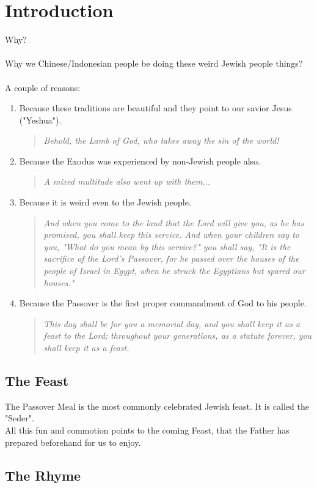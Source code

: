 \documentclass[10pt,oneside,footinclude=true,headinclude=true]{scrbook} %
\newcommand\quot[1]{
	\begin{quote}\textit{\small#1}\end{quote}
}
\begin{document}
\setcounter{chapter}{-1}
\chapter{Introduction}

Why?\\
\\
Why we Chinese/Indonesian people be doing these weird Jewish people things?\\
\\
A couple of reasons:
\begin{enumerate}
	\item{
		Because these traditions are beautiful and they point to our savior Jesus ("Yeshua").
		\quot{Behold, the Lamb of God, who takes away the sin of the world!} %
	}
	\item{
		Because the Exodus was experienced by non-Jewish people also.
		\quot{A mixed multitude also went up with them...} %
	}
	\item{
		Because it is weird even to the Jewish people.
		\quot{And when you come to the land that the Lord will give you, as he has promised, you shall keep this service. And when your children say to you, "What do you mean by this service?" you shall say, "It is the sacrifice of the Lord's Passover, for he passed over the houses of the people of Israel in Egypt, when he struck the Egyptians but spared our houses."} %
	}
	\item{
		Because the Passover is the first proper commandment of God to his people.
		\quot{This day shall be for you a memorial day, and you shall keep it as a feast to the Lord; throughout your generations, as a statute forever, you shall keep it as a feast.} %
	}
\end{enumerate}


\section{The Feast}
The Passover Meal is the most commonly celebrated Jewish feast. It is called the "Seder".\\

All this fun and commotion points to the coming Feast, that the Father has prepared beforehand for us to enjoy.



\section{The Rhyme}
\end{document}
